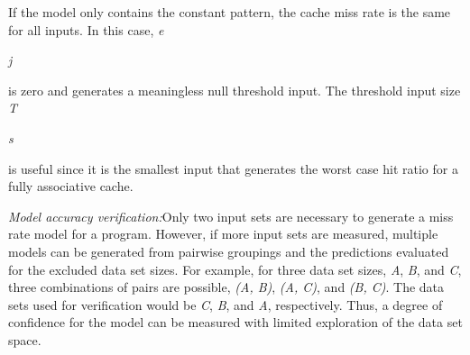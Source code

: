 \documentclass[12pt]{article}
\begin{document}
\vspace{\baselineskip}
\begin{adjustwidth}{0.0in}{0.07in}
{\fontsize{10pt}{12.0pt}\selectfont \textcolor[HTML]{333333}{If the model only contains the constant pattern, the cache miss rate is the same for all inputs. In this case, \textit{e}}{\fontsize{7pt}{8.4pt}\selectfont \textit{\textcolor[HTML]{333333}{j}}{\fontsize{10pt}{12.0pt}\selectfont \textcolor[HTML]{333333}{ is zero and generates a meaningless null threshold input. The threshold input size \textit{T}}{\fontsize{7pt}{8.4pt}\selectfont \textit{\textcolor[HTML]{333333}{s}}{\fontsize{10pt}{12.0pt}\selectfont \textcolor[HTML]{333333}{ is useful since it is the smallest input that generates the worst case hit ratio for a fully associative cache.}\par}\par}\par}\par}\par}\par

\end{adjustwidth}


\vspace{\baselineskip}
\begin{adjustwidth}{0.0in}{0.07in}
{\fontsize{10pt}{12.0pt}\selectfont \textit{\textcolor[HTML]{333333}{Model accuracy verification:}}\textcolor[HTML]{333333}{Only two input sets are necessary to generate a miss rate model for a\textit{ }program. However, if more input sets are measured, multiple models can be generated from pairwise groupings and the predictions evaluated for the excluded data set sizes. For example, for three data set sizes, \textit{A}, \textit{B}, and \textit{C}, three combinations of pairs are possible, \textit{(A, B)}, \textit{(A, C)}, and \textit{(B, C)}. The data sets used for verification would be \textit{C}, \textit{B}, and \textit{A}, respectively. Thus, a degree of confidence for the model can be measured with limited exploration of the data set space.}\par}\par

\end{adjustwidth}


\vspace{\baselineskip}

\vspace{\baselineskip}

\vspace{\baselineskip}
\end{document}
